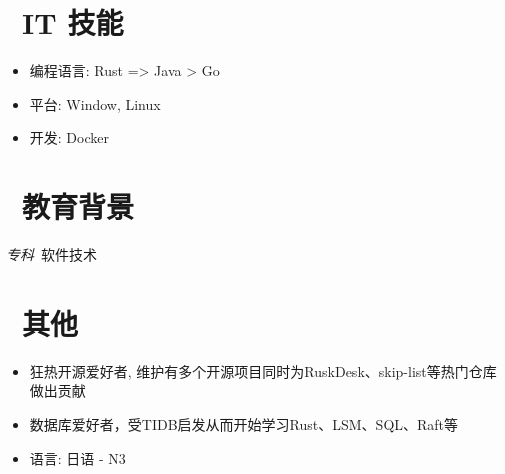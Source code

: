 \documentclass{resume}
\begin{document}

\section{\faCogs\ IT 技能}
\begin{itemize}[parsep=0.5ex]
  \item 编程语言: Rust => Java > Go
  \item 平台: Window, Linux
  \item 开发: Docker
\end{itemize}

\section{\faGraduationCap\  教育背景}
\textit{专科}\ 软件技术

\section{\faInfo\ 其他}
\begin{itemize}[parsep=0.5ex]
  \item 狂热开源爱好者, 维护有多个开源项目同时为RuskDesk、skip-list等热门仓库做出贡献
  \item 数据库爱好者，受TIDB启发从而开始学习Rust、LSM、SQL、Raft等
  \item 语言: 日语 - N3
\end{itemize}

%
%
\end{document}
